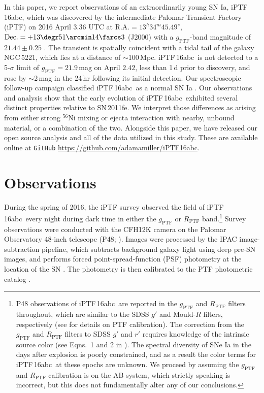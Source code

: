 \documentclass[twocolumn]{aastex61}
\newcommand{\abc}{iPTF\,16abc}
\begin{document}
In this paper, we report observations of an extraordinarily young SN Ia, \abc,
which was discovered by the intermediate Palomar Transient Factory (iPTF) on
2016 April $3.36$ UTC at $\textrm{R.A.}=13^h34^m45.49^s$,
$\textrm{Dec.}=+13\degr51\arcmin14\farcs3$ (J2000) with a
$g_\mathrm{PTF}$-band magnitude of $21.44\pm0.25$ \citep{2016ATel.8907....1M}.
The transient is spatially coincident with a tidal tail of the galaxy
NGC\,5221, which lies at a distance of $\sim$100\,Mpc. \abc\ is not detected
to a 5-$\sigma$ limit of $g_\mathrm{PTF}=21.9$\,mag on April $2.42$,
less than 1\,d prior to discovery, and rose by $\sim$2\,mag in the 24\,hr
following its initial detection. Our spectroscopic follow-up campaign
classified \abc\ as a normal SN Ia \citep{2016ATel.8909....1C}. Our
observations and analysis show that the early evolution of \abc\ exhibited
several distinct properties relative to SN\,2011fe. We interpret those
differences as arising from either strong $^{56}$Ni mixing or ejecta
interaction with nearby, unbound material, or a combination of the
two. Alongside this paper, we have released our open source analysis and all
of the data utilized in this study. These are available online at
\texttt{GitHub} \url{https://github.com/adamamiller/iPTF16abc}.



\section{Observations}
\label{sec:obs}

During the spring of 2016, the iPTF survey observed the field of \abc\ every
night during dark time in either the $g_\mathrm{PTF}$ or $R_\mathrm{PTF}$
band.\footnote{P48 observations of \abc\ are reported in the $g_\mathrm{PTF}$
and $R_\mathrm{PTF}$ filters throughout, which are similar to the SDSS $g'$
and Mould-$R$ filters, respectively (see \citealt{2012PASP..124..854O} for
details on PTF calibration). The correction from the $g_\mathrm{PTF}$ and
$R_\mathrm{PTF}$ filters to SDSS $g'$ and $r'$ requires knowledge of the
intrinsic source color (see Eqns.~1 and 2 in \citealt{2012PASP..124..854O}).
The spectral diversity of SNe Ia in the days after explosion is poorly
constrained, and as a result the color terms for \abc\ at these epochs are
unknown. We proceed by assuming the $g_\mathrm{PTF}$ and $R_\mathrm{PTF}$
calibration is on the AB system, which strictly speaking is incorrect, but
this does not fundamentally alter any of our conclusions.} Survey observations
were conducted with the CFH12K camera \citep{2008SPIE.7014E..4YR} on the
Palomar Observatory 48-inch telescope (P48; \citealt{2009PASP..121.1395L}).
Images were processed by the IPAC image-subtraction pipeline, which subtracts
background galaxy light using deep pre-SN images, and performs forced
point-spread-function (PSF) photometry at the location of the SN
\citep{2017PASP..129a4002M}. The photometry is then calibrated to the PTF
photometric catalog \citep{2012PASP..124..854O}.
\end{document}
